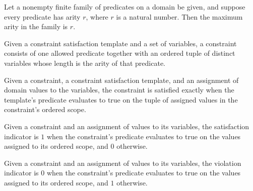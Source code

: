 \begin{theorem}
\label{FABL.CSPTemplate.maxArity_eq_of_forall_arity_eq}
\leanok
{}
Let a nonempty finite family of predicates on a domain be given, and suppose every
predicate has arity $r$, where $r$ is a natural number. Then the maximum arity in the
family is $r$.
\end{theorem}

\begin{definition}
\label{FABL.CSPConstraint}
\leanok
{}
Given a constraint satisfaction template and a set of variables, a constraint consists
of one allowed predicate together with an ordered tuple of distinct variables whose
length is the arity of that predicate.
\end{definition}

\begin{definition}
\label{FABL.CSPConstraint.Satisfied}
\leanok
{}
Given a constraint, a constraint satisfaction template, and an assignment of domain
values to the variables, the constraint is satisfied exactly when the template's
predicate evaluates to true on the tuple of assigned values in the constraint's ordered
scope.
\end{definition}

\begin{definition}
\label{FABL.CSPConstraint.satisfiedIndicator}
\leanok
{}
Given a constraint and an assignment of values to its variables, the satisfaction
indicator is $1$ when the constraint’s predicate evaluates to true on the values
assigned to its ordered scope, and $0$ otherwise.
\end{definition}

\begin{definition}
\label{FABL.CSPConstraint.unsatisfiedIndicator}
\leanok
{}
Given a constraint and an assignment of values to its variables, the violation indicator
is $0$ when the constraint’s predicate evaluates to true on the values assigned to its
ordered scope, and $1$ otherwise.
\end{definition}

